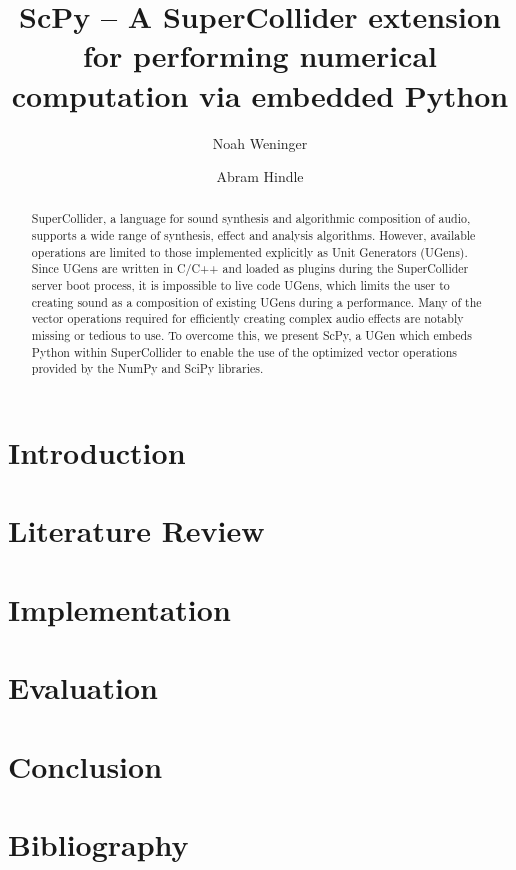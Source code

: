 \documentclass{article}
\begin{document}
\title{ScPy -- A SuperCollider extension for performing numerical computation via embedded Python}
\author{Noah Weninger \and Abram Hindle}

\maketitle

\begin{abstract}
    SuperCollider, a language for sound synthesis and algorithmic composition of audio,
    supports a wide range of synthesis, effect and analysis algorithms. However, available
    operations are limited to those implemented explicitly as Unit Generators (UGens). Since UGens
    are written in C/C++ and loaded as plugins during the SuperCollider server boot process, it is
    impossible to live code UGens, which limits the user to creating sound as a composition of
    existing UGens during a performance. Many of the vector operations required for efficiently
    creating complex audio effects are notably missing or tedious to use. To overcome this, we
    present ScPy, a UGen which embeds Python within SuperCollider to enable the use of the
    optimized vector operations provided by the NumPy and SciPy libraries.
\end{abstract}

\section{Introduction}

\section{Literature Review}

\section{Implementation}

\section{Evaluation}

\section{Conclusion}

\section{Bibliography}
\end{document}
